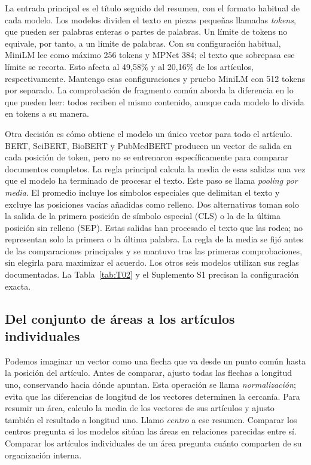 \documentclass[12pt]{article}
\begin{document}
La entrada principal es el título seguido del resumen, con el formato habitual de cada modelo. Los modelos dividen el texto en piezas pequeñas llamadas \emph{tokens}, que pueden ser palabras enteras o partes de palabras. Un límite de tokens no equivale, por tanto, a un límite de palabras. Con su configuración habitual, MiniLM lee como máximo 256 tokens y MPNet 384; el texto que sobrepasa ese límite se recorta. Esto afecta al 49,58\% y al 20,16\% de los artículos, respectivamente. Mantengo esas configuraciones y pruebo MiniLM con 512 tokens por separado. La comprobación de fragmento común aborda la diferencia en lo que pueden leer: todos reciben el mismo contenido, aunque cada modelo lo divida en tokens a su manera.

Otra decisión es cómo obtiene el modelo un único vector para todo el artículo. BERT, SciBERT, BioBERT y PubMedBERT producen un vector de salida en cada posición de token, pero no se entrenaron específicamente para comparar documentos completos. La regla principal calcula la media de esas salidas una vez que el modelo ha terminado de procesar el texto. Este paso se llama \emph{pooling por media}. El promedio incluye los símbolos especiales que delimitan el texto y excluye las posiciones vacías añadidas como relleno. Dos alternativas toman solo la salida de la primera posición de símbolo especial (CLS) o la de la última posición sin relleno (SEP). Estas salidas han procesado el texto que las rodea; no representan solo la primera o la última palabra. La regla de la media se fijó antes de las comparaciones principales y se mantuvo tras las primeras comprobaciones, sin elegirla para maximizar el acuerdo. Los otros seis modelos utilizan sus reglas documentadas. La Tabla~\ref{tab:T02} y el Suplemento S1 precisan la configuración exacta.


\subsection{Del conjunto de áreas a los artículos individuales}
Podemos imaginar un vector como una flecha que va desde un punto común hasta la posición del artículo. Antes de comparar, ajusto todas las flechas a longitud uno, conservando hacia dónde apuntan. Esta operación se llama \emph{normalización}; evita que las diferencias de longitud de los vectores determinen la cercanía. Para resumir un área, calculo la media de los vectores de sus artículos y ajusto también el resultado a longitud uno. Llamo \emph{centro} a ese resumen. Comparar los centros pregunta si los modelos sitúan las áreas en relaciones parecidas entre sí. Comparar los artículos individuales de un área pregunta cuánto comparten de su organización interna.
\end{document}
